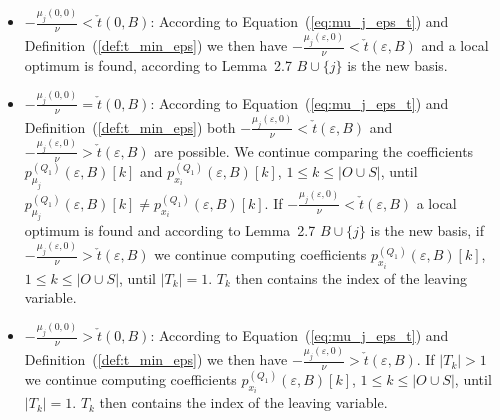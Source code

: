 \documentclass[a4paper]{article}
\newcommand{\pmu}[2]{\ensuremath{p_{\mu_{j}}^{(#1)}(\varepsilon, #2)}}
\newcommand{\px}[3]{\ensuremath{p_{x_{#1}}^{(#2)}(\varepsilon, #3)}}
\begin{document}
\begin{itemize}
\item $-\frac{\mu_{j}(0, 0)}{\nu} < \check{t}(0, B)$:
According to Equation~(\ref{eq:mu_j_eps_t}) and
Definition~(\ref{def:t_min_eps}) we then have
$-\frac{\mu_{j}(\varepsilon, 0)}{\nu} < \check{t}(\varepsilon, B)$ and a local
optimum is found, according to Lemma~2.7 $B \cup \{j\}$ is the new basis.

\item $-\frac{\mu_{j}(0, 0)}{\nu} = \check{t}(0, B)$:
According to Equation~(\ref{eq:mu_j_eps_t}) and
Definition~(\ref{def:t_min_eps})
both $-\frac{\mu_{j}(\varepsilon, 0)}{\nu} < \check{t}(\varepsilon, B)$ and
$-\frac{\mu_{j}(\varepsilon, 0)}{\nu} > \check{t}(\varepsilon, B)$ are
possible.
We continue comparing the coefficients $\pmu{Q_{1}}{B}[k]$ and
$\px{i}{Q_{1}}{B}[k]$, $1 \leq k \leq \left|O \cup S \right|$,
until $\pmu{Q_{1}}{B}[k] \neq \px{i}{Q_{1}}{B}[k]$.  
If $-\frac{\mu_{j}(\varepsilon, 0)}{\nu} < \check{t}(\varepsilon, B)$
a local optimum is found and according to Lemma~2.7 $B \cup \{j\}$ is the new
basis,
if $-\frac{\mu_{j}(\varepsilon, 0)}{\nu} > \check{t}(\varepsilon, B)$
we continue computing coefficients
$\px{i}{Q_{1}}{B}[k]$, $1 \leq k \leq \left|O \cup S \right|$, until
$\left|T_{k}\right|=1$. $T_{k}$ then contains the index of the leaving
variable.
 
\item $-\frac{\mu_{j}(0, 0)}{\nu} > \check{t}(0, B)$:
According to Equation~(\ref{eq:mu_j_eps_t}) and
Definition~(\ref{def:t_min_eps}) we then have
$-\frac{\mu_{j}(\varepsilon, 0)}{\nu} > \check{t}(\varepsilon, B)$. If
$\left|T_{k}\right| > 1$ we continue computing coefficients
$\px{i}{Q_{1}}{B}[k]$, $1 \leq k \leq \left|O \cup S \right|$, until
$\left|T_{k}\right|=1$. $T_{k}$ then contains the index of the leaving
variable.
\end{itemize}
\end{document}
